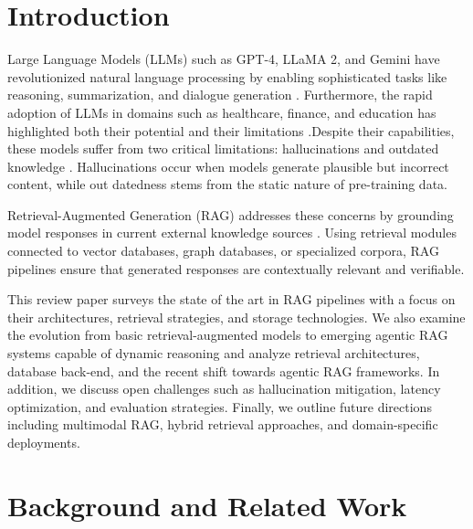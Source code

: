 \documentclass[conference]{IEEEtran}
\begin{document}
\section{Introduction}
Large Language Models (LLMs) such as GPT-4, LLaMA 2, and Gemini have revolutionized natural language processing by enabling sophisticated tasks like reasoning, summarization, and dialogue generation \cite{brown2020language,touvron2023llama,anil2023gemini}. Furthermore, the rapid adoption of LLMs in domains such as healthcare, finance, and education has highlighted both their potential and their limitations \cite{openai2023gpt4, singhal2023towards, bommasani2021opportunities}.Despite their capabilities, these models suffer from two critical limitations: hallucinations and outdated knowledge \cite{ji2023survey,rawte2023survey}. Hallucinations occur when models generate plausible but incorrect content, while out datedness stems from the static nature of pre-training data. 

Retrieval-Augmented Generation (RAG) addresses these concerns by grounding model responses in current external knowledge sources \cite{lewis2020rag}. Using retrieval modules connected to vector databases, graph databases, or specialized corpora, RAG pipelines ensure that generated responses are contextually relevant and verifiable. 

This review paper surveys the state of the art in RAG pipelines with a focus on their architectures, retrieval strategies, and storage technologies. We also examine the evolution from basic retrieval-augmented models to emerging agentic RAG systems capable of dynamic reasoning and analyze retrieval architectures, database back-end, and the recent shift towards agentic RAG frameworks. In addition, we discuss open challenges such as hallucination mitigation, latency optimization, and evaluation strategies. Finally, we outline future directions including multimodal RAG, hybrid retrieval approaches, and domain-specific deployments.

\section{Background and Related Work}
\end{document}
